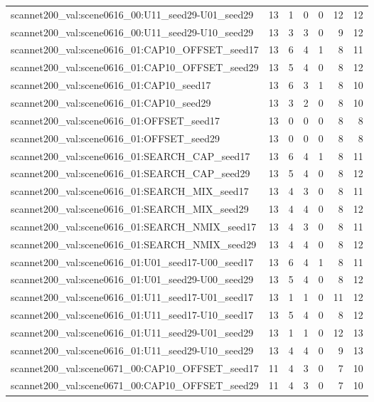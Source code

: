 \begin{table}[t]
\begin{tabular}{lrrrrrr}
scannet200\_val:scene0616\_00:U11\_seed29-U01\_seed29 & 13 & 1 & 0 & 0 & 12 & 12 \\
scannet200\_val:scene0616\_00:U11\_seed29-U10\_seed29 & 13 & 3 & 3 & 0 & 9 & 12 \\
scannet200\_val:scene0616\_01:CAP10\_OFFSET\_seed17 & 13 & 6 & 4 & 1 & 8 & 11 \\
scannet200\_val:scene0616\_01:CAP10\_OFFSET\_seed29 & 13 & 5 & 4 & 0 & 8 & 12 \\
scannet200\_val:scene0616\_01:CAP10\_seed17 & 13 & 6 & 3 & 1 & 8 & 10 \\
scannet200\_val:scene0616\_01:CAP10\_seed29 & 13 & 3 & 2 & 0 & 8 & 10 \\
scannet200\_val:scene0616\_01:OFFSET\_seed17 & 13 & 0 & 0 & 0 & 8 & 8 \\
scannet200\_val:scene0616\_01:OFFSET\_seed29 & 13 & 0 & 0 & 0 & 8 & 8 \\
scannet200\_val:scene0616\_01:SEARCH\_CAP\_seed17 & 13 & 6 & 4 & 1 & 8 & 11 \\
scannet200\_val:scene0616\_01:SEARCH\_CAP\_seed29 & 13 & 5 & 4 & 0 & 8 & 12 \\
scannet200\_val:scene0616\_01:SEARCH\_MIX\_seed17 & 13 & 4 & 3 & 0 & 8 & 11 \\
scannet200\_val:scene0616\_01:SEARCH\_MIX\_seed29 & 13 & 4 & 4 & 0 & 8 & 12 \\
scannet200\_val:scene0616\_01:SEARCH\_NMIX\_seed17 & 13 & 4 & 3 & 0 & 8 & 11 \\
scannet200\_val:scene0616\_01:SEARCH\_NMIX\_seed29 & 13 & 4 & 4 & 0 & 8 & 12 \\
scannet200\_val:scene0616\_01:U01\_seed17-U00\_seed17 & 13 & 6 & 4 & 1 & 8 & 11 \\
scannet200\_val:scene0616\_01:U01\_seed29-U00\_seed29 & 13 & 5 & 4 & 0 & 8 & 12 \\
scannet200\_val:scene0616\_01:U11\_seed17-U01\_seed17 & 13 & 1 & 1 & 0 & 11 & 12 \\
scannet200\_val:scene0616\_01:U11\_seed17-U10\_seed17 & 13 & 5 & 4 & 0 & 8 & 12 \\
scannet200\_val:scene0616\_01:U11\_seed29-U01\_seed29 & 13 & 1 & 1 & 0 & 12 & 13 \\
scannet200\_val:scene0616\_01:U11\_seed29-U10\_seed29 & 13 & 4 & 4 & 0 & 9 & 13 \\
scannet200\_val:scene0671\_00:CAP10\_OFFSET\_seed17 & 11 & 4 & 3 & 0 & 7 & 10 \\
scannet200\_val:scene0671\_00:CAP10\_OFFSET\_seed29 & 11 & 4 & 3 & 0 & 7 & 10 \\

\end{tabular}
\end{table}
